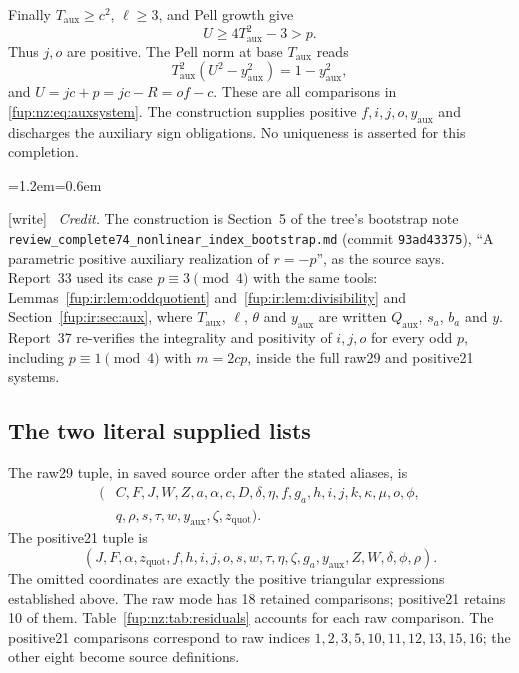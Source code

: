 \documentclass[11pt,letterpaper]{article}
\theoremstyle{definition}\newtheorem{definition}[theorem]{Definition}
\theoremstyle{remark}\newtheorem{remark}[theorem]{Remark}
\newcommand{\Qa}{Q_{\mathrm{aux}}}
\newcommand{\Taux}{T_{\mathrm{aux}}}\newcommand{\yaux}{y_{\mathrm{aux}}}
\newcommand{\zquot}{z_{\mathrm{quot}}}\newcommand{\ga}{g_a}
\newcommand{\wtag}{\textup{[write]}}
\newenvironment{writenote}{\par\smallskip\begin{list}{}{\leftmargin=1.2em\rightmargin=0.6em}\item[]\small\wtag\ }{\end{list}\smallskip}
\newcommand{\rw}[1]{\nolinkurl{#1}}%
\begin{document}
Finally $\Taux\ge c^2$, $\ell\ge3$, and Pell growth give
\[
 U\ge4\Taux^2-3>p.
\]
Thus $j,o$ are positive. The Pell norm at base $\Taux$ reads
\[
 \Taux^2(U^2-\yaux^2)=1-\yaux^2,
\]
and $U=jc+p=jc-R=of-c$. These are all comparisons in \eqref{fup:nz:eq:auxsystem}. The construction supplies positive $f,i,j,o,\yaux$ and discharges the auxiliary sign obligations. No uniqueness is asserted for this completion.
\begin{writenote}
\emph{Credit.} The construction is Section~5 of the tree's bootstrap note \rw{review_complete74_nonlinear_index_bootstrap.md} (commit \texttt{93ad43375}), ``A parametric positive auxiliary realization of $r=-p$'', as the source says. Report~33 used its case $p\equiv3\pmod4$ with the same tools: Lemmas~\ref{fup:ir:lem:oddquotient} and~\ref{fup:ir:lem:divisibility} and Section~\ref{fup:ir:sec:aux}, where $\Taux$, $\ell$, $\theta$ and $\yaux$ are written $\Qa$, $s_a$, $b_a$ and $y$. Report~37 re-verifies the integrality and positivity of $i,j,o$ for every odd $p$, including $p\equiv1\pmod4$ with $m=2cp$, inside the full raw29 and positive21 systems.
\end{writenote}

\subsection{The two literal supplied lists}\label{fup:nz:sec:lists}
The raw29 tuple, in saved source order after the stated aliases, is
\begin{align*}
 (&C,F,J,W,Z,a,\alpha,c,D,\delta,\eta,f,\ga,h,i,j,k,\kappa,\mu,o,\phi,\\
 &q,\rho,s,\tau,w,\yaux,\zeta,\zquot).
\end{align*}
The positive21 tuple is
\[
 (J,F,\alpha,\zquot,f,h,i,j,o,s,w,\tau,\eta,\zeta,\ga,\yaux,Z,W,\delta,\phi,\rho).
\]
The omitted coordinates are exactly the positive triangular expressions established above. The raw mode has 18 retained comparisons; positive21 retains 10 of them. Table~\ref{fup:nz:tab:residuals} accounts for each raw comparison. The positive21 comparisons correspond to raw indices $1,2,3,5,10,11,12,13,15,16$; the other eight become source definitions.
\end{document}
